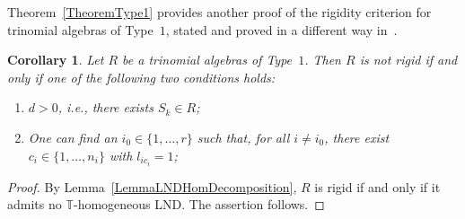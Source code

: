 \documentclass[a4paper,reqno,12pt]{amsart}
\theoremstyle{plain}
\newtheorem{corollary}[theorem]{Corollary}
\theoremstyle{definition}
\theoremstyle{plain}
\theoremstyle{remark}
\newcommand{\TT}{\mathbb{T}}
\begin{document}
Theorem~\ref{TheoremType1} provides another proof of the rigidity criterion for trinomial algebras of Type~$1$, stated and proved in a different way in~\cite[Theorem 3]{G}.
\begin{corollary}\label{CorRigidiryType1}%
    Let $R$ be a trinomial algebras of Type~$1$. Then $R$ is not rigid if and only if one of the following two conditions holds:
    \begin{enumerate}
        \item[$(a)$] $d>0$, i.e., there exists $S_k\in R$;
        \item[$(b)$] One can find an $i_0\in\{ 1,\ldots,r \}$ such that, for all $i\neq i_0$,  there exist $c_i\in\{1,\ldots,n_i\}$ with $l_{ic_i}=1$;
    \end{enumerate}
\end{corollary}
\begin{proof}
    By Lemma~\ref{LemmaLNDHomDecomposition}, $R$ is rigid if and only if it admits no ${\TT}$-homogeneous LND. The assertion follows.    
\end{proof}
\end{document}
